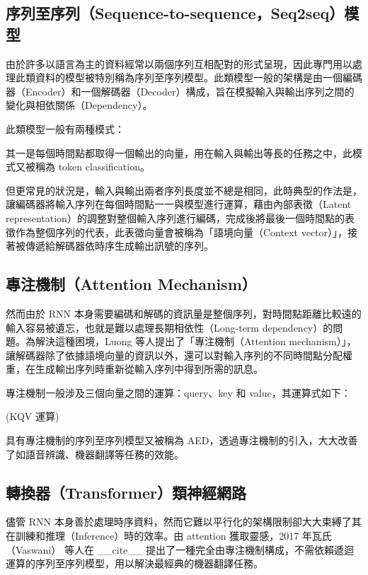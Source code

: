 \subsection{序列至序列（Sequence-to-sequence，Seq2seq）模型}

由於許多以語言為主的資料經常以兩個序列互相配對的形式呈現，因此專門用以處理此類資料的模型被特別稱為序列至序列模型。此類模型一般的架構是由一個編碼器（Encoder）和一個解碼器（Decoder）構成，旨在模擬輸入與輸出序列之間的變化與相依關係（Dependency）。

此類模型一般有兩種模式：

其一是每個時間點都取得一個輸出的向量，用在輸入與輸出等長的任務之中，此模式又被稱為 token classification。

但更常見的狀況是，輸入與輸出兩者序列長度並不總是相同，此時典型的作法是，讓編碼器將輸入序列在每個時間點一一與模型進行運算，藉由內部表徵（Latent representation）的調整對整個輸入序列進行編碼，完成後將最後一個時間點的表徵作為整個序列的代表，此表徵向量會被稱為「語境向量（Context vector）」，接著被傳遞給解碼器依時序生成輸出訊號的序列。

\subsection{專注機制（Attention Mechanism）}

然而由於 RNN 本身需要編碼和解碼的資訊量是整個序列，對時間點距離比較遠的輸入容易被遺忘，也就是難以處理長期相依性（Long-term dependency）的問題。為解決這種困境，Luong 等人提出了「專注機制（Attention mechanism）」，讓解碼器除了依據語境向量的資訊以外，還可以對輸入序列的不同時間點分配權重，在生成輸出序列時重新從輸入序列中得到所需的訊息。

專注機制一般涉及三個向量之間的運算：query、key 和 value，其運算式如下：

(KQV 運算)

具有專注機制的序列至序列模型又被稱為 AED，透過專注機制的引入，大大改善了如語音辨識、機器翻譯等任務的效能。

\subsection{轉換器（Transformer）類神經網路}

儘管 RNN 本身善於處理時序資料，然而它難以平行化的架構限制卻大大束縛了其在訓練和推理（Inference）時的效率。由 attention 獲取靈感，2017 年瓦氏（Vaswani） 等人在 \_\_cite\_\_ 提出了一種完全由專注機制構成，不需依賴遞迴運算的序列至序列模型，用以解決最經典的機器翻譯任務。

